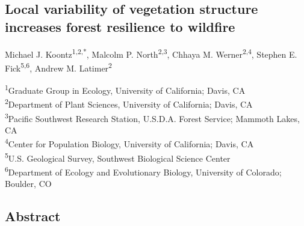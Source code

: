 \documentclass[twoside,12pt,final]{ucthesis-CA2012}
\begin{document}
\begin{ucmainmatter}

\chapter{Local variability of vegetation structure increases forest
resilience to
wildfire}\label{local-variability-of-vegetation-structure-increases-forest-resilience-to-wildfire}

Michael J. Koontz\textsuperscript{1,2,*}, Malcolm P.
North\textsuperscript{2,3}, Chhaya M. Werner\textsuperscript{2,4},
Stephen E. Fick\textsuperscript{5,6}, Andrew M.
Latimer\textsuperscript{2}

\textsuperscript{1}Graduate Group in Ecology, University of California;
Davis, CA\\
\textsuperscript{2}Department of Plant Sciences, University of
California; Davis, CA\\
\textsuperscript{3}Pacific Southwest Research Station, U.S.D.A. Forest
Service; Mammoth Lakes, CA\\
\textsuperscript{4}Center for Population Biology, University of
California; Davis, CA\\
\textsuperscript{5}U.S. Geological Survey, Southwest Biological Science
Center\\
\textsuperscript{6}Department of Ecology and Evolutionary Biology,
University of Colorado; Boulder, CO

\section{Abstract}\label{abstract}


\end{ucmainmatter}
\end{document}
